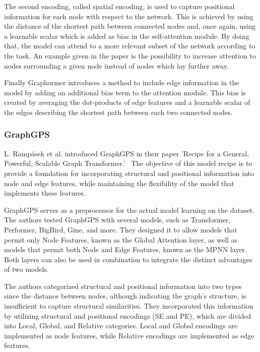 The second encoding, called spatial encoding, is used to capture positional information for each node with respect to the network. This is achieved by using the distance of the shortest path between connected nodes and, once again, using a learnable scalar which is added as bias in the self-attention module. By doing that, the model can attend to a more relevant subset of the network according to the task. An example given in the paper is the possibility to increase attention to nodes surrounding a given node instead of nodes which lay further away.

Finally Graphormer introduces a method to include edge information in the model by adding an additional bias term to the attention module. This bias is created by averaging the dot-products of edge features and a learnable scalar of the edges describing the shortest path between each two connected nodes.  

\subsubsection{GraphGPS}
L. Rampásek et al. introduced GraphGPS in their paper 'Recipe for a General, Powerful, Scalable Graph Transformer.'~\cite{2023graphgps} The objective of this model recipe is to provide a foundation for incorporating structural and positional information into node and edge features, while maintaining the flexibility of the model that implements these features.

GraphGPS serves as a preprocessor for the actual model learning on the dataset. The authors tested GraphGPS with several models, such as Transformer, Performer, BigBird, Gine, and more. They designed it to allow models that permit only Node Features, known as the Global Attention layer, as well as models that permit both Node and Edge Features, known as the MPNN layer. Both layers can also be used in combination to integrate the distinct advantages of two models.

The authors categorized structural and positional information into two types since the distance between nodes, although indicating the graph's structure, is insufficient to capture structural similarities. They incorporated this information by utilizing structural and positional encodings (SE and PE), which are divided into Local, Global, and Relative categories. Local and Global encodings are implemented as node features, while Relative encodings are implemented as edge features.


